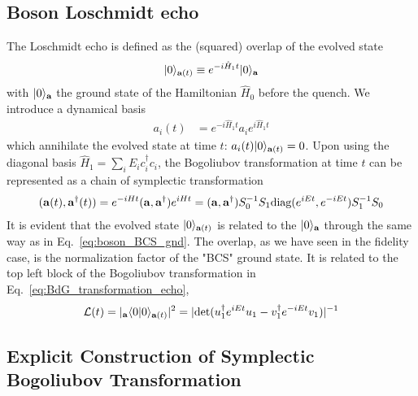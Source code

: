 \subsection{Boson Loschmidt echo}
\label{app_sub:boson_Loschmidt_echo}

The Loschmidt echo is defined as the (squared) overlap of the evolved state
\begin{equation}\begin{aligned}
|0\rangle_{{\bf a}(t)}\equiv e^{-i\hat{H}_1t}|0\rangle_{\bf a}
\end{aligned}\end{equation}
with $|0\rangle_{\bf a}$ the ground state of the Hamiltonian $\hat{H}_0$ before the quench. We introduce a dynamical basis
\begin{equation}\begin{aligned}
a_i(t)&=e^{-i\hat{H}_1t}a_ie^{i\hat{H}_1t}
\end{aligned}\end{equation}
which annihilate the evolved state at time $t$: $a_i(t)|0\rangle_{{\bf a}(t)}=0$. Upon using the diagonal basis $\hat{H}_1=\sum_iE_ic_i^\dagger c_i$, the Bogoliubov transformation at time $t$ can be represented as a chain of symplectic transformation
\begin{equation}\begin{aligned}
\label{eq:BdG_transformation_echo}
({\bf a}(t),{\bf a}^\dagger(t))=e^{-iHt}
({\bf a} , {\bf a}^\dagger)e^{iHt}=({\bf a},{\bf a}^\dagger)S_0^{-1}S_1\text{diag}(e^{iEt},e^{-iEt})S_1^{-1}S_0
\end{aligned}\end{equation}
It is evident that the evolved state $|0\rangle_{{\bf a}(t)}$ is related to the $|0\rangle_{{\bf a}}$ through the same way as in Eq.~\eqref{eq:boson_BCS_gnd}. The overlap, as we have seen in the fidelity case, is the normalization factor of the "BCS" ground state. It is related to the top left block of the Bogoliubov transformation in Eq.~\eqref{eq:BdG_transformation_echo},
\begin{equation}\begin{aligned}
\label{eq:echo_t}
\mathcal{L}(t)=|_{\bf a}\langle0|0\rangle_{{\bf a}(t)}|^2=|\text{det}(u_1^\dagger e^{iEt}u_1-v_1^\dagger e^{-iEt}v_1)|^{-1}
\end{aligned}\end{equation}

\subsection{Explicit Construction of Symplectic Bogoliubov Transformation}
\label{app_sub:construction_Bogoliubov}

